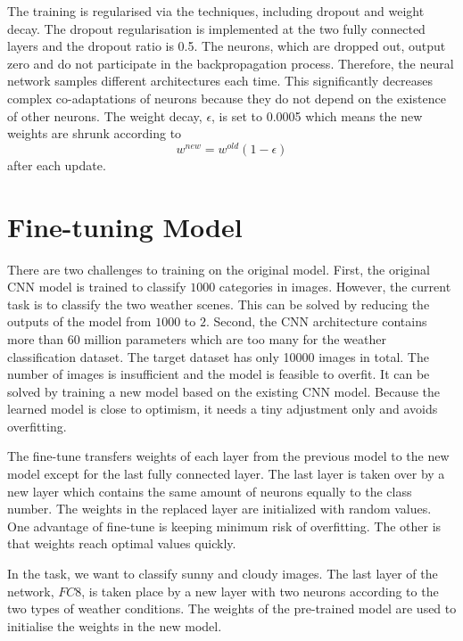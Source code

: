 The training is regularised via the techniques, including dropout and weight decay. The dropout regularisation is implemented at the two fully connected layers and the dropout ratio is 0.5. The neurons, which are dropped out, output zero and do not participate in the backpropagation process. Therefore, the neural network samples different architectures each time. This significantly decreases complex co-adaptations of neurons because they do not depend on the existence of other neurons. The weight decay, $\epsilon$, is set to 0.0005 which means the new weights are shrunk according to 
\begin{equation}\label{eq:WeightDecay}
w^{new} = w^{old}(1 - \epsilon)
\end{equation}
after each update.

\section{Fine-tuning Model}

There are two challenges to training on the original model. First, the original CNN model is trained to classify $1000$ categories in images. However, the current task is to classify the two weather scenes. This can be solved by reducing the outputs of the model from $1000$ to $2$. Second, the CNN architecture contains more than 60 million parameters which are too many for the weather classification dataset. The target dataset has only 10000 images in total. The number of images is insufficient and the model is feasible to overfit. It can be solved by training a new model based on the existing CNN model. Because the learned model is close to optimism, it needs a tiny adjustment only and avoids overfitting.

The fine-tune transfers weights of each layer from the previous model to the new model except for the last fully connected layer. The last layer is taken over by a new layer which contains the same amount of neurons equally to the class number. The weights in the replaced layer are initialized with random values. One advantage of fine-tune is keeping minimum risk of overfitting. The other is that weights reach optimal values quickly.

In the task, we want to classify sunny and cloudy images. The last layer of the network, $FC8$, is taken place by a new layer with two neurons according to the two types of weather conditions. The weights of the pre-trained model are used to initialise the weights in the new model. 

